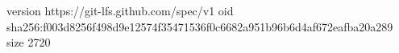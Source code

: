 version https://git-lfs.github.com/spec/v1
oid sha256:f003d8256f498d9e12574f35471536f0c6682a951b96b6d4af672eafba20a289
size 2720
